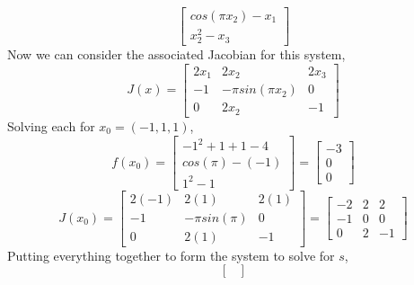 \documentclass[12pt]{article}
\makeatletter
\theoremstyle{homework}
\newenvironment{exercise}[1]
{\def\@currentlabel{#1}\exercisecore}
{\endexercisecore}
\makeatother
\begin{document}
\begin{exercise}{P5}
\begin{enumerate}[a.]
\begin{equation*}
\begin{bmatrix}
              cos(\pi x_2) -x_1        \\
              x_2^2 - x_3
            \end{bmatrix}
          \end{equation*}
          Now we can consider the associated Jacobian for this system,
          \begin{equation*}
            J(x) = \begin{bmatrix}
              2x_1 & 2x_2              & 2x_3 \\
              -1   & -\pi sin(\pi x_2) & 0    \\
              0    & 2x_2              & -1
            \end{bmatrix}
          \end{equation*}
          Solving each for $x_0 = (-1,1,1)$,
          \begin{equation*}
            f(x_0) =
            \begin{bmatrix}
              -1^2 +1 + 1 - 4 \\
              cos(\pi) -(-1)  \\
              1^2 - 1
            \end{bmatrix}
            =
            \begin{bmatrix}
              -3 \\
              0  \\
              0
            \end{bmatrix}
          \end{equation*}
          \begin{equation*}
            J(x_0) =
            \begin{bmatrix}
              2(-1) & 2(1)          & 2(1) \\
              -1    & -\pi sin(\pi) & 0    \\
              0     & 2(1)          & -1
            \end{bmatrix}
            =
            \begin{bmatrix}
              -2 & 2 & 2  \\
              -1 & 0 & 0  \\
              0  & 2 & -1
            \end{bmatrix}
          \end{equation*}
          Putting everything together to form the system to solve for $s$,
          \begin{equation*}
            \begin{bmatrix}

\end{bmatrix}
\end{equation*}
\end{enumerate}
\end{exercise}
\end{document}
